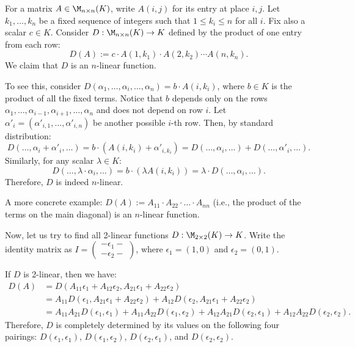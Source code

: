 \begin{example}\label{ex:n_linear_product}
  For a matrix $A \in \M_{n \times n}(K)$, write $A(i,j)$ for its entry at place $i,j$. Let $k_1, \dots, k_n$ be a fixed sequence of integers such that $1 \le k_i \le n$ for all $i$. Fix also a scalar $c \in K$. Consider $D : \M_{n \times n}(K) \to K$ defined by the product of one entry from each row:
  \[
  D(A) := c \cdot A(1, k_1) \cdot A(2, k_2) \cdots A(n, k_n).
  \]
  We claim that $D$ is an $n$-linear function.

  To see this, consider $D(\alpha_1, \dots, \alpha_i, \dots, \alpha_n) = b \cdot A(i, k_i)$, where $b \in K$ is the product of all the fixed terms. Notice that $b$ depends only on the rows $\alpha_1, \dots, \alpha_{i-1}, \alpha_{i+1}, \dots, \alpha_n$ and does not depend on row $i$.
  Let $\alpha'_i = (\alpha'_{i,1}, \dots, \alpha'_{i,n})$ be another possible $i$-th row. Then, by standard distribution:
  \[
  D(\dots, \alpha_i + \alpha'_i, \dots) = b \cdot (A(i, k_i) + \alpha'_{i, k_i}) = D(\dots, \alpha_i, \dots) + D(\dots, \alpha'_i, \dots).
  \]
  Similarly, for any scalar $\lambda \in K$:
  \[
  D(\dots, \lambda \cdot \alpha_i, \dots) = b \cdot (\lambda A(i, k_i)) = \lambda \cdot D(\dots, \alpha_i, \dots).
  \]
  Therefore, $D$ is indeed $n$-linear.
\end{example}

\begin{example}\label{ex:diagonal_product}
  A more concrete example: $D(A) := A_{11} \cdot A_{22} \cdot \dots \cdot A_{nn}$ (i.e., the product of the terms on the main diagonal) is an $n$-linear function.
\end{example}

Now, let us try to find all 2-linear functions $D: \M_{2 \times 2}(K) \to K$. Write the identity matrix as $I = \left(\begin{smallmatrix} -\epsilon_1- \\ -\epsilon_2- \end{smallmatrix}\right)$, where $\epsilon_1 = (1, 0)$ and $\epsilon_2 = (0, 1)$.

If $D$ is 2-linear, then we have:
\begin{align*}
  D(A) &= D(A_{11}\epsilon_1 + A_{12}\epsilon_2, A_{21}\epsilon_1 + A_{22}\epsilon_2) \\
  &= A_{11} D(\epsilon_1, A_{21}\epsilon_1 + A_{22}\epsilon_2) + A_{12} D(\epsilon_2, A_{21}\epsilon_1 + A_{22}\epsilon_2) \\
  &= A_{11}A_{21}D(\epsilon_1, \epsilon_1) + A_{11}A_{22}D(\epsilon_1, \epsilon_2) + A_{12}A_{21}D(\epsilon_2, \epsilon_1) + A_{12}A_{22}D(\epsilon_2, \epsilon_2).
\end{align*}
Therefore, $D$ is completely determined by its values on the following four pairings: $D(\epsilon_1, \epsilon_1)$, $D(\epsilon_1, \epsilon_2)$, $D(\epsilon_2, \epsilon_1)$, and $D(\epsilon_2, \epsilon_2)$.

